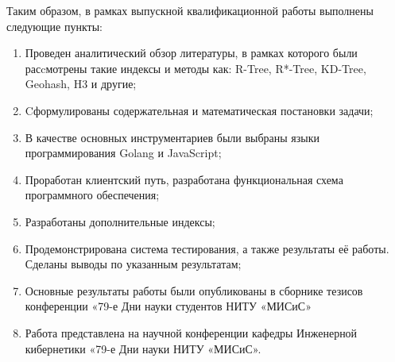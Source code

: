 \Conclusion

Таким образом, в рамках выпускной квалификационной работы выполнены следующие пункты:
\begin{enumerate}
    \item Проведен аналитический обзор литературы, в рамках которого были расcмотрены такие индексы и методы как: R-Tree, R*-Tree, KD-Tree, Geohash, H3 и другие;
    \item Cформулированы содержательная и математическая постановки задачи;
    \item В качестве основных инструментариев были выбраны языки программирования Golang и JavaScript;
    \item Проработан клиентский путь, разработана функциональная схема программного обеспечения;
    \item Разработаны дополнительные индексы;
    \item Продемонстрирована система тестирования, а также результаты её работы. Сделаны выводы по указанным результатам;
    \item Основные результаты работы были опубликованы в сборнике тезисов конференции «79-е Дни науки студентов НИТУ «МИСиС» 
    \item Работа представлена на научной конференции кафедры Инженерной кибернетики «79-е Дни науки НИТУ «МИСиС».
\end{enumerate}

